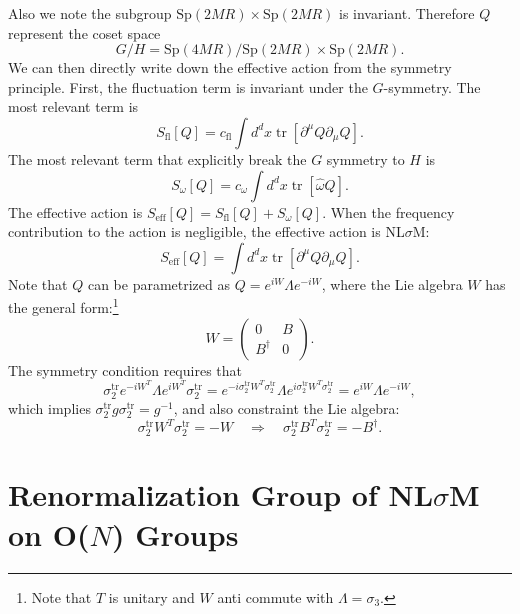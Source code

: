 \documentclass[aps,prb,superscriptaddress,nofootinbib]{revtex4}
\def \tr{\operatorname{tr}}
\begin{document}
Also we note the subgroup $\mathrm{Sp}(2MR)\times\mathrm{Sp}(2MR)$ is invariant. 
Therefore $Q$ represent the coset space 
\begin{equation}
	G/H = \mathrm{Sp}(4MR)/\mathrm{Sp}(2MR)\times\mathrm{Sp}(2MR).
\end{equation}
We can then directly write down the effective action from the symmetry principle.
First, the fluctuation term is invariant under the $G$-symmetry.
The most relevant term is
\begin{equation}
	S_\mathrm{fl}[Q] = c_\mathrm{fl} \int d^d x \tr[\partial^\mu Q\partial_\mu Q].
\end{equation}
The most relevant term that explicitly break the $G$ symmetry to $H$ is
\begin{equation}
	S_{\omega}[Q] = c_\omega \int d^d x \tr[\hat \omega Q].
\end{equation}
The effective action is $S_\mathrm{eff}[Q] = S_\mathrm{fl}[Q]+S_{\omega}[Q]$.
When the frequency contribution to the action is negligible, the effective action is NL$\sigma$M:
\begin{equation}
	S_\mathrm{eff}[Q] = \int d^d x \tr[\partial^\mu Q \partial_\mu Q].
\end{equation}
Note that $Q$ can be parametrized as $Q=e^{iW} \Lambda e^{-iW}$, where the Lie algebra $W$ has the general form:\footnote{Note that $T$ is unitary and $W$ anti commute with $\Lambda=\sigma_3$.}
\begin{equation}\label{eq:AL-Liealg}
	W = \begin{pmatrix}
		0 & B \\ B^\dagger & 0
	\end{pmatrix}.
\end{equation}
The symmetry condition requires that
\begin{equation}
	\sigma_2^\mathrm{tr} e^{-iW^T} \Lambda e^{iW^T} \sigma_2^\mathrm{tr} 
	= e^{-i \sigma_2^\mathrm{tr} W^T \sigma_2^\mathrm{tr}} \Lambda e^{i \sigma_2^\mathrm{tr}W^T\sigma_2^\mathrm{tr}}
	= e^{iW} \Lambda e^{-iW},
\end{equation}
which implies $\sigma_2^\mathrm{tr}g\sigma_2^\mathrm{tr}=g^{-1}$, and also constraint the Lie algebra:
\begin{equation}
	\sigma_2^\mathrm{tr}W^T\sigma_2^\mathrm{tr} = -W \quad \Longrightarrow \quad
	\sigma_2^\mathrm{tr}B^T\sigma_2^\mathrm{tr} = -B^\dagger.
\end{equation}



\section{Renormalization Group of NL$\sigma$M on O($N$) Groups}
\end{document}
